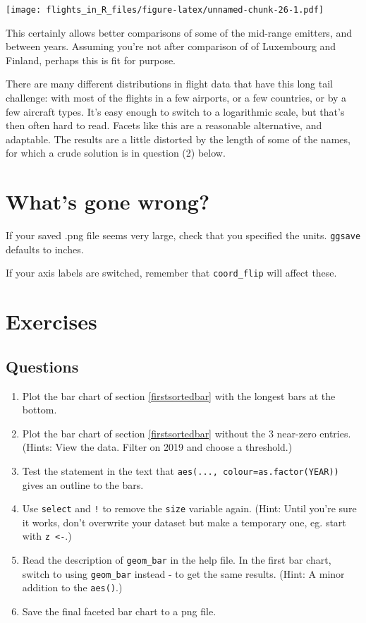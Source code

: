 \documentclass[
]{book}
\providecommand{\tightlist}{%
  \setlength{\itemsep}{0pt}\setlength{\parskip}{0pt}}
\begin{document}
\texttt{[image: flights\_in\_R\_files/figure-latex/unnamed-chunk-26-1.pdf]}

This certainly allows better comparisons of some of the mid-range emitters, and between years. Assuming you're not after comparison of of Luxembourg and Finland, perhaps this is fit for purpose.

There are many different distributions in flight data that have this long tail challenge: with most of the flights in a few airports, or a few countries, or by a few aircraft types. It's easy enough to switch to a logarithmic scale, but that's then often hard to read. Facets like this are a reasonable alternative, and adaptable. The results are a little distorted by the length of some of the names, for which a crude solution is in question (2) below.

\hypertarget{whats-gone-wrong-4}{%
\section{What's gone wrong?}\label{whats-gone-wrong-4}}

If your saved .png file seems very large, check that you specified the units. \texttt{ggsave} defaults to inches.

If your axis labels are switched, remember that \texttt{coord\_flip} will affect these.

\hypertarget{exercises-1}{%
\section{Exercises}\label{exercises-1}}

\hypertarget{questions-3}{%
\subsection{Questions}\label{questions-3}}

\begin{enumerate}
\def\labelenumi{\arabic{enumi})}
\tightlist
\item
  Plot the bar chart of section \ref{firstsortedbar} with the longest bars at the bottom.
\item
  Plot the bar chart of section \ref{firstsortedbar} without the 3 near-zero entries. (Hints: View the data. Filter on 2019 and choose a threshold.)
\item
  Test the statement in the text that \texttt{aes(...,\ colour=as.factor(YEAR))} gives an outline to the bars.
\item
  Use \texttt{select} and \texttt{!} to remove the \texttt{size} variable again. (Hint: Until you're sure it works, don't overwrite your dataset but make a temporary one, eg. start with \texttt{z\ \textless{}-}.)
\item
  Read the description of \texttt{geom\_bar} in the help file. In the first bar chart, switch to using \texttt{geom\_bar} instead - to get the same results. (Hint: A minor addition to the \texttt{aes()}.)
\item
  Save the final faceted bar chart to a png file.
\end{enumerate}
\end{document}
